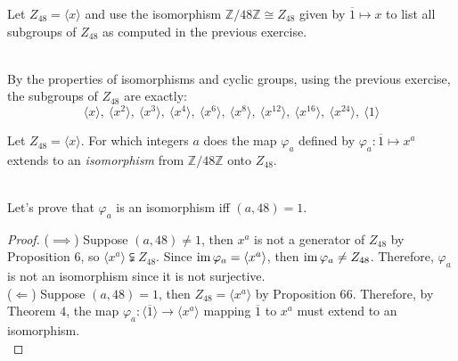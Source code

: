 \begin{solution}
\begin{center}
    \end{center}
\end{solution}

\begin{exercise}
    Let $Z_{48}=\langle x\rangle$ and use the isomorphism $\mathbb{Z}/48
    \mathbb{Z} \cong Z_{48}$ given by $\overline{1}\mapsto x$ to list all
    subgroups of $Z_{48}$ as computed in the previous exercise.\\
\end{exercise}

\begin{solution}
    \\By the properties of isomorphisms and cyclic groups, using the
    previous exercise, the subgroups of $Z_{48}$ are exactly:
    $$\langle x\rangle,\ \langle x^2\rangle,\ \langle x^3\rangle,\ 
    \langle x^4\rangle,\ \langle x^6\rangle,\ \langle x^8\rangle,\
    \langle x^{12}\rangle,\ \langle x^{16}\rangle,\ \langle x^{24}\rangle
    ,\ \langle 1\rangle$$
\end{solution}

\begin{exercise}
    Let $Z_{48}=\langle x\rangle$. For which integers $a$ does the map
    $\varphi_a$ defined by $\varphi_a:\overline{1}\mapsto x^a$ extends to
    an \textit{isomorphism} from $\mathbb{Z}/48\mathbb{Z}$ onto $Z_{48}$.\\
\end{exercise}

\begin{solution}
    \\ Let's prove that $\varphi_a$ is an isomorphism iff $(a,48)=1$.
    \begin{proof}
        ($\implies$) Suppose $(a,48)\neq 1$, then $x^a$ is not a generator
        of $Z_{48}$ by Proposition $6$, so $\langle x^a\rangle \subsetneqq
        Z_{48}$. Since $\operatorname{im}\varphi_a = \langle x^a\rangle$, then
        $\operatorname{im}\varphi_a \neq Z_{48}$. Therefore, $\varphi_a$ is not an
        isomorphism since it is not surjective.\\
        ($\Longleftarrow$) Suppose $(a,48)=1$, then $Z_{48}=\langle x^a
        \rangle$ by Proposition 6$6$. Therefore, by Theorem $4$, the map
        $\varphi_a:\langle \overline{1}\rangle \to \langle x^a\rangle$
        mapping $\overline{1}$ to $x^a$ must extend to an isomorphism.\\
    \end{proof}
\end{solution}

